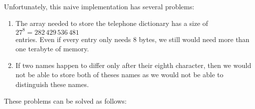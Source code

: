 \noindent
Unfortunately, this naive implementation has several problems: 
\begin{enumerate}
\item The array needed to store the telephone dictionary has a size of 
      \\[0.2cm]
      \hspace*{1.3cm} $27^8 = 282\,429\,536\,481$ \\[0.2cm]
      entries.  Even if every entry only needs 8 bytes, we still would need more than one terabyte
      of memory.
\item If two names happen to differ only after their eighth character, then we would not be able to
      store both of theses names as we would not be able to distinguish these names.
\end{enumerate}
These problems can be solved as follows:
